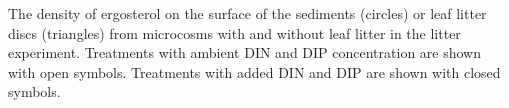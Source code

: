 \label{fig:erg_areal}
The density of ergosterol on the surface of the sediments (circles) or leaf litter discs (triangles) from microcosms with and without leaf litter in the litter experiment. Treatments with ambient DIN and DIP concentration are shown with open symbols. Treatments with added DIN and DIP are shown with closed symbols.